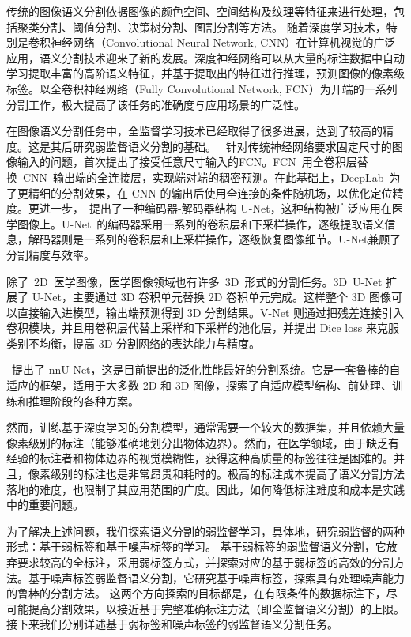 传统的图像语义分割依据图像的颜色空间、空间结构及纹理等特征来进行处理，包括聚类分割\citep{coates2012learning}、阈值分割\citep{ying2005fast}、决策树分割\citep{shotton2008semantic}、图割分割\citep{vicente2008graph}等方法。
随着深度学习技术，特别是卷积神经网络（Convolutional Neural Network, CNN）在计算机视觉的广泛应用，语义分割技术迎来了新的发展。深度神经网络可以从大量的标注数据中自动学习提取丰富的高阶语义特征，并基于提取出的特征进行推理，预测图像的像素级标签。以全卷积神经网络（Fully Convolutional Network, FCN）为开端的一系列分割工作，极大提高了该任务的准确度与应用场景的广泛性。

在图像语义分割任务中，全监督学习技术已经取得了很多进展，达到了较高的精度。这是其后研究弱监督语义分割的基础。
\citet{long2015fully}~针对传统神经网络要求固定尺寸的图像输入的问题，首次提出了接受任意尺寸输入的FCN。FCN~用全卷积层替换~CNN~输出端的全连接层，实现端对端的稠密预测。在此基础上，DeepLab~为了更精细的分割效果，在 CNN 的输出后使用全连接的条件随机场，以优化定位精度。更进一步，\citet{ronneberger2015u}~提出了一种编码器-解码器结构 U-Net，这种结构被广泛应用在医学图像上。U-Net~的编码器采用一系列的卷积层和下采样操作，逐级提取语义信息，解码器则是一系列的卷积层和上采样操作，逐级恢复图像细节。U-Net兼顾了分割精度与效率。

除了~2D~医学图像，医学图像领域也有许多~3D~形式的分割任务。3D~U-Net 扩展了 U-Net，主要通过 3D 卷积单元替换 2D 卷积单元完成。这样整个 3D 图像可以直接输入进模型，输出端预测得到 3D 分割结果。V-Net 则通过把残差连接引入卷积模块，并且用卷积层代替上采样和下采样的池化层，并提出 Dice loss 来克服类别不均衡，提高 3D 分割网络的表达能力与精度。

\citet{isensee2019automated}~提出了 nnU-Net，这是目前提出的泛化性能最好的分割系统。它是一套鲁棒的自适应的框架，适用于大多数 2D 和 3D 图像，探索了自适应模型结构、前处理、训练和推理阶段的各种方案。

然而，训练基于深度学习的分割模型，通常需要一个较大的数据集，并且依赖大量像素级别的标注（能够准确地划分出物体边界）。然而，在医学领域，由于缺乏有经验的标注者和物体边界的视觉模糊性，获得这种高质量的标签往往是困难的。并且，像素级别的标注也是非常昂贵和耗时的。极高的标注成本提高了语义分割方法落地的难度，也限制了其应用范围的广度。因此，如何降低标注难度和成本是实践中的重要问题。

为了解决上述问题，我们探索语义分割的弱监督学习，具体地，研究弱监督的两种形式：基于弱标签和基于噪声标签的学习。
基于弱标签的弱监督语义分割\citep{papandreou2015weakly,rajchl2016deepcut,cai2018accurate,ji2019scribble,kervadec2020bounding}，它放弃要求较高的全标注，采用弱标签方式，并探索对应的基于弱标签的高效的分割方法。基于噪声标签弱监督语义分割\citep{Zhu2019PickandLearnAQ,Xue2020CascadedRL,Zhang2020RobustMI}，它研究基于噪声标签，探索具有处理噪声能力的鲁棒的分割方法。
这两个方向探索的目标都是，在有限条件的数据标注下，尽可能提高分割效果，以接近基于完整准确标注方法（即全监督语义分割）的上限。
接下来我们分别详述基于弱标签和噪声标签的弱监督语义分割任务。

